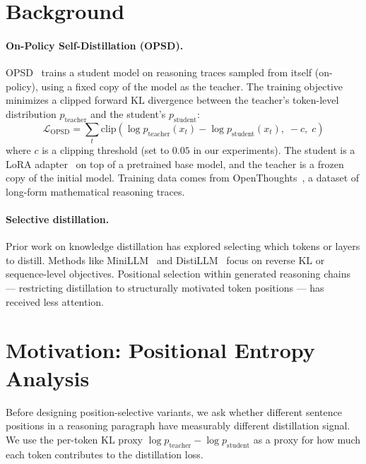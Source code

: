 \documentclass{article}
\begin{document}
\section{Background}
\label{sec:background}

\paragraph{On-Policy Self-Distillation (OPSD).}
OPSD~\cite{opsd2025} trains a student model on reasoning traces sampled from itself (on-policy), using a fixed copy of the model as the teacher.
The training objective minimizes a clipped forward KL divergence between the teacher's token-level distribution $p_{\text{teacher}}$ and the student's $p_{\text{student}}$:
\begin{equation}
    \mathcal{L}_{\text{OPSD}} = \sum_{t} \text{clip}\!\left(\log p_{\text{teacher}}(x_t) - \log p_{\text{student}}(x_t),\; -c,\; c\right)
\end{equation}
where $c$ is a clipping threshold (set to $0.05$ in our experiments).
The student is a LoRA adapter~\cite{hu2022lora} on top of a pretrained base model, and the teacher is a frozen copy of the initial model.
Training data comes from OpenThoughts~\cite{openthoughts2025}, a dataset of long-form mathematical reasoning traces.

\paragraph{Selective distillation.}
Prior work on knowledge distillation has explored selecting which tokens or layers to distill.
Methods like MiniLLM~\cite{gu2024minillm} and DistiLLM~\cite{ko2024distillm} focus on reverse KL or sequence-level objectives.
Positional selection within generated reasoning chains — restricting distillation to structurally motivated token positions — has received less attention.

\section{Motivation: Positional Entropy Analysis}
\label{sec:motivation}

Before designing position-selective variants, we ask whether different sentence positions in a reasoning paragraph have measurably different distillation signal.
We use the per-token KL proxy $\log p_{\text{teacher}} - \log p_{\text{student}}$ as a proxy for how much each token contributes to the distillation loss.
\end{document}
